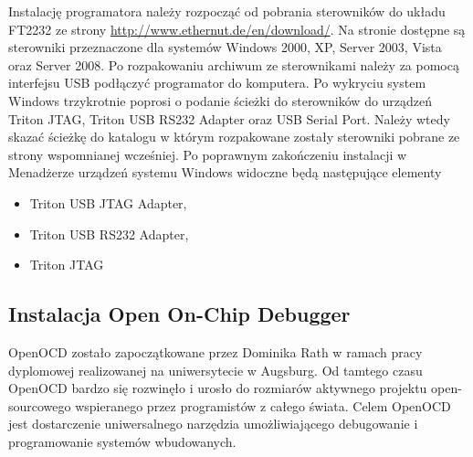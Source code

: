 Instalację programatora należy rozpocząć od pobrania sterowników do układu FT2232
ze strony \url{http://www.ethernut.de/en/download/}. Na stronie dostępne są
sterowniki przeznaczone dla systemów Windows 2000, XP, Server 2003, Vista oraz
Server 2008. Po rozpakowaniu archiwum ze sterownikami należy za pomocą interfejsu
USB podłączyć programator do komputera. Po wykryciu system Windows trzykrotnie
poprosi o podanie ścieżki do sterowników do urządzeń Triton JTAG, Triton USB
RS232 Adapter oraz USB Serial Port. Należy wtedy skazać ścieżkę do katalogu w
którym rozpakowane zostały sterowniki pobrane ze strony wspomnianej wcześniej. Po
poprawnym zakończeniu instalacji w Menadżerze urządzeń systemu Windows widoczne
będą następujące elementy
\begin{itemize}
  \item Triton USB JTAG Adapter,
  \item Triton USB RS232 Adapter,
  \item Triton JTAG
\end{itemize}

\subsection{Instalacja Open On-Chip Debugger}
OpenOCD zostało zapoczątkowane przez Dominika Rath w ramach pracy dyplomowej
realizowanej na uniwersytecie w Augsburg. Od tamtego czasu OpenOCD bardzo się
rozwinęło i urosło do rozmiarów aktywnego projektu open-sourcowego wspieranego
przez programistów z całego świata. Celem OpenOCD jest dostarczenie
uniwersalnego narzędzia umożliwiającego debugowanie i programowanie systemów
wbudowanych.
 

